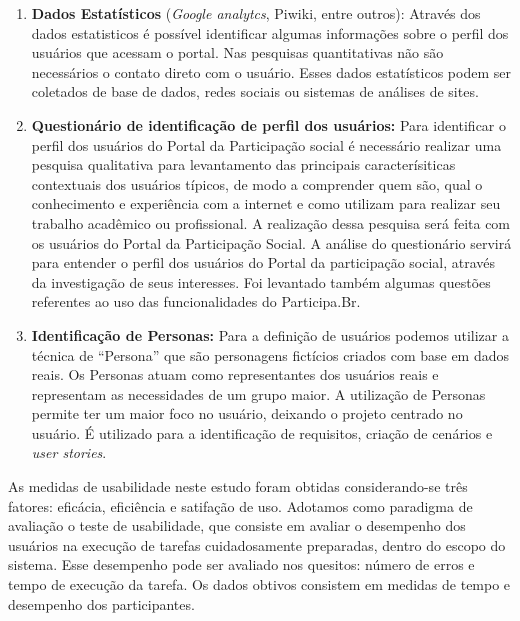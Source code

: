 \begin{enumerate}
\item \textbf{Dados Estatísticos} (\textit{Google analytcs}, Piwiki, entre outros): Através dos dados estatisticos é possível identificar algumas informações sobre o perfil dos usuários que acessam o portal. Nas pesquisas quantitativas não são necessários o contato direto com o usuário. Esses dados estatísticos podem ser coletados de base de dados, redes sociais ou sistemas de análises de sites.

\item \textbf{Questionário de identificação de perfil dos usuários:} Para identificar o perfil dos usuários do Portal da Participação social é necessário realizar uma pesquisa qualitativa para levantamento das principais caracterísiticas contextuais dos usuários típicos, de modo a comprender quem são, qual o conhecimento e experiência com a internet e como utilizam para realizar seu trabalho acadêmico ou profissional. A realização dessa pesquisa será feita com os usuários do Portal da Participação Social.
%
A análise do questionário servirá para entender o perfil dos usuários do Portal da participação social, através da investigação de seus interesses. Foi levantado também algumas questões referentes ao uso das funcionalidades do Participa.Br.

\item \textbf{Identificação de Personas:} Para a definição de usuários podemos utilizar a técnica de “Persona” que são personagens fictícios criados com base em dados reais. Os Personas atuam como representantes dos usuários reais e representam as necessidades de um grupo maior. 
%
A utilização de Personas permite ter um maior foco no usuário, deixando o projeto centrado no usuário. É utilizado para a identificação de requisitos, criação de cenários e \textit{user stories}. 
%
%

\end{enumerate}

As medidas de usabilidade neste estudo foram obtidas considerando-se três fatores: eficácia, eficiência e satifação de uso.
%
Adotamos como paradigma de avaliação o teste de usabilidade, que consiste em avaliar o desempenho dos usuários na execução de tarefas cuidadosamente preparadas, dentro do escopo do sistema. Esse desempenho pode ser avaliado nos quesitos: número de erros e tempo de execução da tarefa. %
Os dados obtivos consistem em medidas de tempo e desempenho dos participantes.


